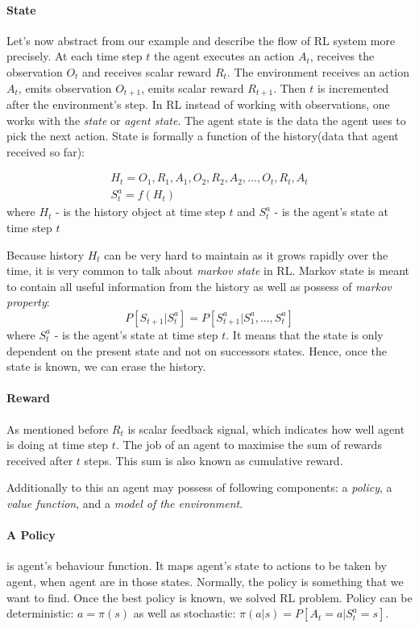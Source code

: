 \paragraph{State} \label{sec:comp_rl}
Let's now abstract from our example and describe the flow of RL system more precisely.
At each time step $t$ the agent executes an action $A_t$, receives the observation $O_t$
and receives scalar reward $R_t$. The environment receives an action $A_t$,
emits observation $O_{t+1}$, emits scalar reward $R_{t+1}$. Then $t$ is incremented
after the environment's step. In RL instead of working with observations, one works
with the \emph{state} or \emph{agent state}. The agent state is the data the agent uses
to pick the next action. State is formally a function of the
history(data that agent received so far):

\begin{align} \label{eq:rl_state}
	H_t = O_1, R_1, A_1, O_2, R_2, A_2, ..., O_t, R_t, A_t \\
	S_t^a = f(H_t)
\end{align}
where $H_t$ - is the history object at time step $t$ and
$S_t^a$ - is the agent's state at time step $t$

Because history $H_t$ can be very hard to maintain as it grows rapidly over the time,
it is very common to talk about \emph{markov state} in RL. Markov state is meant
to contain all useful information from the history as well as possess of \emph{markov property}:
\begin{equation} \label{eq:markov_property}
	P[S_{t+1} | S_t^a] = P[S_{t+1}^a | S_1^a, ..., S_t^a]
\end{equation}
where $S_t^a$ - is the agent's state at time step $t$.
It means that the state is only dependent on the present state and not on
successors states. Hence, once the state is known, we can erase the history.

\paragraph{Reward} As mentioned before $R_t$ is scalar feedback signal, which
indicates how well agent is doing at time step $t$. The job of an agent to
maximise the sum of rewards received after $t$ steps. This sum is also known as
cumulative reward.

Additionally to this an agent may possess of following components:
a \emph{policy},
a \emph{value function}, and
a \emph{model of the environment}.

\paragraph{A Policy} is agent's behaviour function. It maps agent's state
to actions to be taken by agent, when agent are in those states. Normally, the policy is
something that we want to find. Once the best policy is known, we solved RL problem.
Policy can be deterministic: $a = \pi (s)$
as well as stochastic: $\pi(a|s) = P[A_t = a|S_t^a = s]$.

